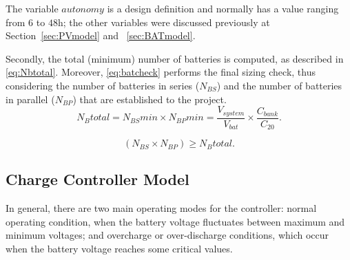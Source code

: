 \documentclass[journal]{IEEEtran}
\begin{document}
The variable $autonomy$ is a design definition and normally has a value ranging from $6$ to $48$h; the other variables were discussed previously at Section~\ref{sec:PVmodel} and ~\ref{sec:BATmodel}.

Secondly, the total (minimum) number of batteries is computed, as described in \eqref{eq:Nbtotal}. Moreover, \eqref{eq:batcheck} performs the final sizing check, thus considering the number of batteries in series ($ N_{BS} $) and the number of batteries in parallel ($ N_{BP} $) that are established to the project.
\begin{equation}
\label{eq:Nbtotal}
N_{B}total = N_{BS}min \times N_{BP}min = \dfrac{V_{system}}{V_{bat}} \times \dfrac{C_{bank}}{C_{20}}.
\end{equation}

\begin{equation}
\label{eq:batcheck}
\left( N_{BS} \times  N_{BP} \right) \geq N_{B}total.
\end{equation}

\subsection{Charge Controller Model}


%
%
%
%
In general, there are two main operating modes for the controller: normal operating condition, when the battery voltage fluctuates between maximum and minimum voltages; and overcharge or over-discharge conditions, which occur when the battery voltage reaches some critical values. 
\end{document}
